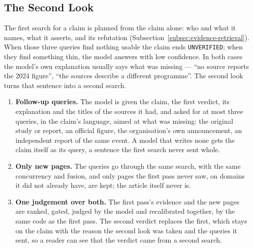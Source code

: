 
\subsection{The Second Look}
\label{subsec:second-look}

The first search for a claim is planned from the claim alone: who and
what it names, what it asserts, and its refutation
(Subsection~\ref{subsec:evidence-retrieval}). When those three queries
find nothing usable the claim ends \texttt{UNVERIFIED}; when they find
something thin, the model answers with low confidence. In both cases the
model's own explanation usually says what was missing --- ``no source
reports the 2024 figure'', ``the sources describe a different
programme''. The second look turns that sentence into a second search.

\begin{enumerate}
    \item \textbf{Follow-up queries.} The model is given the claim, the
    first verdict, its explanation and the titles of the sources it had,
    and asked for at most three queries, in the claim's language, aimed
    at what was missing: the original study or report, an official
    figure, the organisation's own announcement, an independent report
    of the same event. A model that writes none gets the claim itself as
    its query, a sentence the first search never sent whole.
    \item \textbf{Only new pages.} The queries go through the same
    search, with the same concurrency and fusion, and only pages the
    first pass never saw, on domains it did not already have, are kept;
    the article itself never is.
    \item \textbf{One judgement over both.} The first pass's evidence
    and the new pages are ranked, gated, judged by the model and
    recalibrated together, by the same code as the first pass. The
    second verdict replaces the first, which stays on the claim with the
    reason the second look was taken and the queries it sent, so a
    reader can see that the verdict came from a second search.
\end{enumerate}

